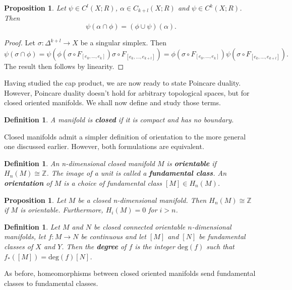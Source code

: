 \documentclass{article}
\newtheorem{definition}[theorem]{Definition}
\newtheorem{proposition}[theorem]{Proposition}
\begin{document}
\begin{proposition}
Let $\psi\in C^l(X;R)$, $\alpha\in C_{k+l}(X;R)$ and $\psi\in C^k(X;R)$. Then \[\psi(\alpha\cap\phi)=(\phi\cup\psi)(\alpha).\]
\end{proposition}
\begin{proof}
Let $\sigma\colon\Delta^{k+l}\to X$ be a singular simplex. Then \[\psi(\sigma\cap\phi)=\psi(\phi(\sigma\circ F_{[e_0,...,e_k]})\sigma\circ F_{[e_k,...,e_{k+l}]})=\phi(\sigma\circ F_{[e_0,...,e_k]})\psi(\sigma\circ F_{[e_k,...,e_{k+l}]}).\]
The result then follows by linearity.
\end{proof}

Having studied the cap product, we are now ready to state Poincare duality. However, Poincare duality doesn't hold for arbitrary topological spaces, but for closed oriented manifolds. We shall now define and study those terms.



\begin{definition}
A manifold is \textbf{closed} if it is compact and has no boundary.
\end{definition}

\noindent Closed manifolds admit a simpler definition of orientation to the more general one discussed earlier. However, both formulations are equivalent.

\begin{definition}
An n-dimensional closed manifold $M$ is \textbf{orientable} if $H_n(M)\cong \mathbb{Z}$. The image of a unit is called a \textbf{fundamental class}. An \textbf{orientation} of $M$ is a choice of fundamental class $[M]\in H_n(M)$.
\end{definition}


\begin{proposition}
Let $M$ be a closed n-dimensional manifold. Then $H_n(M)\cong \mathbb{Z}$ if $M$ is orientable. Furthermore, $H_i(M)=0$ for $i>n$.
\end{proposition}

\begin{definition}
Let $M$ and $N$ be closed connected orientable $n$-dimensional manifolds, let $f\colon M\to N$ be continuous and let $[M]$ and $[N]$ be fundamental classes of $X$ and $Y$. Then the \textbf{degree} of $f$ is the integer $\text{deg}(f)$ such that $f_*([M])=\text{deg}(f)[N]$.
\end{definition}

\noindent As before, homeomorphisms between closed oriented manifolds send fundamental classes to fundamental classes.
\end{document}
